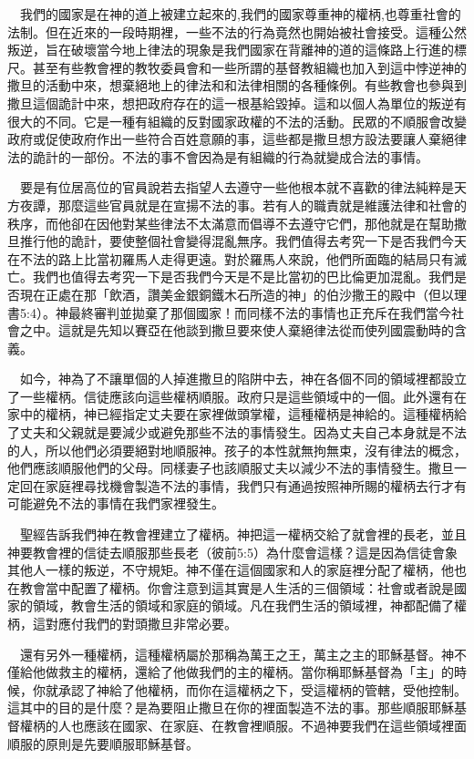 \documentclass{book}
\begin{document}
　我們的國家是在神的道上被建立起來的,我們的國家尊重神的權柄,也尊重社會的法制。但在近來的一段時期裡，一些不法的行為竟然也開始被社會接受。這種公然叛逆，旨在破壞當今地上律法的現象是我們國家在背離神的道的這條路上行進的標尺。甚至有些教會裡的教牧委員會和一些所謂的基督教組織也加入到這中悖逆神的撒旦的活動中來，想棄絕地上的律法和和法律相關的各種條例。有些教會也參與到撒旦這個詭計中來，想把政府存在的這一根基給毀掉。這和以個人為單位的叛逆有很大的不同。它是一種有組織的反對國家政權的不法的活動。民眾的不順服會改變政府或促使政府作出一些符合百姓意願的事，這些都是撒旦想方設法要讓人棄絕律法的詭計的一部份。不法的事不會因為是有組織的行為就變成合法的事情。

　要是有位居高位的官員說若去指望人去遵守一些他根本就不喜歡的律法純粹是天方夜譚，那麼這些官員就是在宣揚不法的事。若有人的職責就是維護法律和社會的秩序，而他卻在因他對某些律法不太滿意而倡導不去遵守它們，那他就是在幫助撒旦推行他的詭計，要使整個社會變得混亂無序。我們值得去考究一下是否我們今天在不法的路上比當初羅馬人走得更遠。對於羅馬人來說，他們所面臨的結局只有滅亡。我們也值得去考究一下是否我們今天是不是比當初的巴比倫更加混亂。我們是否現在正處在那「飲酒，讚美金銀銅鐵木石所造的神」的伯沙撒王的殿中（但以理書5:4）。神最終審判並拋棄了那個國家！而同樣不法的事情也正充斥在我們當今社會之中。這就是先知以賽亞在他談到撒旦要來使人棄絕律法從而使列國震動時的含義。

　如今，神為了不讓單個的人掉進撒旦的陷阱中去，神在各個不同的領域裡都設立了一些權柄。信徒應該向這些權柄順服。政府只是這些領域中的一個。此外還有在家中的權柄，神已經指定丈夫要在家裡做頭掌權，這種權柄是神給的。這種權柄給了丈夫和父親就是要減少或避免那些不法的事情發生。因為丈夫自己本身就是不法的人，所以他們必須要絕對地順服神。孩子的本性就無拘無束，沒有律法的概念，他們應該順服他們的父母。同樣妻子也該順服丈夫以減少不法的事情發生。撒旦一定回在家庭裡尋找機會製造不法的事情，我們只有通過按照神所賜的權柄去行才有可能避免不法的事情在我們家裡發生。

　聖經告訴我們神在教會裡建立了權柄。神把這一權柄交給了就會裡的長老，並且神要教會裡的信徒去順服那些長老（彼前5:5）為什麼會這樣？這是因為信徒會象其他人一樣的叛逆，不守規矩。神不僅在這個國家和人的家庭裡分配了權柄，他也在教會當中配置了權柄。你會注意到這其實是人生活的三個領域：社會或者說是國家的領域，教會生活的領域和家庭的領域。凡在我們生活的領域裡，神都配備了權柄，這對應付我們的對頭撒旦非常必要。

　還有另外一種權柄，這種權柄屬於那稱為萬王之王，萬主之主的耶穌基督。神不僅給他做救主的權柄，還給了他做我們的主的權柄。當你稱耶穌基督為「主」的時候，你就承認了神給了他權柄，而你在這權柄之下，受這權柄的管轄，受他控制。這其中的目的是什麼？是為要阻止撒旦在你的裡面製造不法的事。那些順服耶穌基督權柄的人也應該在國家、在家庭、在教會裡順服。不過神要我們在這些領域裡面順服的原則是先要順服耶穌基督。
\end{document}

